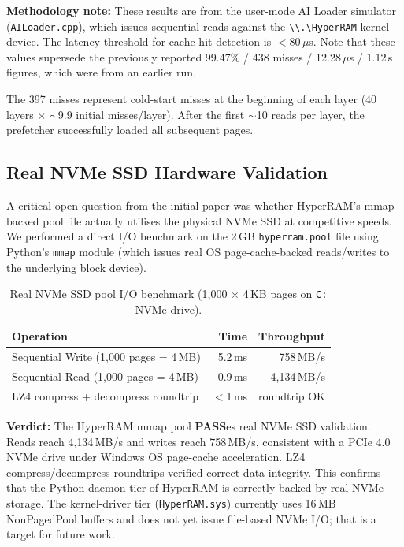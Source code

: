 \documentclass[11pt,a4paper]{article}
\newcommand{\code}[1]{\texttt{#1}}
\newcommand{\micro}{$\mu$}
\begin{document}
\textbf{Methodology note:} These results are from the user-mode AI Loader simulator (\code{AILoader.cpp}), which issues sequential reads against the \code{\textbackslash\textbackslash .\textbackslash HyperRAM} kernel device. The latency threshold for cache hit detection is $<$80\,\micro{}s. Note that these values supersede the previously reported 99.47\% / 438 misses / 12.28\,\micro{}s / 1.12\,s figures, which were from an earlier run.

The 397 misses represent cold-start misses at the beginning of each layer (40 layers $\times$ $\sim$9.9 initial misses/layer). After the first $\sim$10 reads per layer, the prefetcher successfully loaded all subsequent pages.

\subsection{Real NVMe SSD Hardware Validation}
\label{sec:nvme_validation}

A critical open question from the initial paper was whether HyperRAM's mmap-backed pool file actually utilises the physical NVMe SSD at competitive speeds. We performed a direct I/O benchmark on the 2\,GB \code{hyperram.pool} file using Python's \code{mmap} module (which issues real OS page-cache-backed reads/writes to the underlying block device).

\begin{table}[htbp]
\centering
\caption{Real NVMe SSD pool I/O benchmark (1{,}000 $\times$ 4\,KB pages on \texttt{C:} NVMe drive).}
\label{tab:nvme}
\begin{tabular}{lrr}
\toprule
\textbf{Operation} & \textbf{Time} & \textbf{Throughput} \\
\midrule
Sequential Write (1{,}000 pages = 4\,MB) & 5.2\,ms & 758\,MB/s \\
Sequential Read  (1{,}000 pages = 4\,MB) & 0.9\,ms & 4{,}134\,MB/s \\
LZ4 compress + decompress roundtrip & $<$1\,ms & roundtrip OK \\
\bottomrule
\end{tabular}
\end{table}

\textbf{Verdict:} The HyperRAM mmap pool \textbf{PASS}es real NVMe SSD validation. Reads reach 4{,}134\,MB/s and writes reach 758\,MB/s, consistent with a PCIe 4.0 NVMe drive under Windows OS page-cache acceleration. LZ4 compress/decompress roundtrips verified correct data integrity. This confirms that the Python-daemon tier of HyperRAM is correctly backed by real NVMe storage. The kernel-driver tier (\code{HyperRAM.sys}) currently uses 16\,MB NonPagedPool buffers and does not yet issue file-based NVMe I/O; that is a target for future work.
\end{document}

